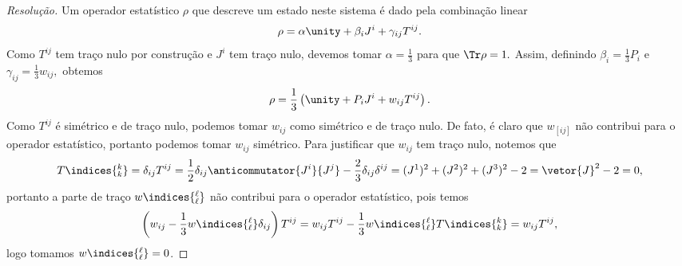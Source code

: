 \begin{proof}[Resolução]
    Um operador estatístico \(\rho\) que descreve um estado neste sistema é dado pela combinação linear
    \begin{equation*}
        \rho = \alpha\unity + \beta_i J^i + \gamma_{ij} T^{ij}.
    \end{equation*}
    Como \(T^{ij}\) tem traço nulo por construção e \(J^i\) tem traço nulo, devemos tomar \(\alpha = \frac13\) para que \(\Tr\rho = 1.\) Assim, definindo \(\beta_i = \frac13 P_i\) e \(\gamma_{ij} = \frac13 w_{ij},\) obtemos
    \begin{equation*}
        \rho = \frac13 \left(\unity + P_i J^i + w_{ij} T^{ij}\right).
    \end{equation*}
    Como \(T^{ij}\) é simétrico e de traço nulo, podemos tomar \(w_{ij}\) como simétrico e de traço nulo. De fato, é claro que \(w_{[ij]}\) não contribui para o operador estatístico, portanto podemos tomar \(w_{ij}\) simétrico. Para justificar que \(w_{ij}\) tem traço nulo, notemos que 
    \begin{equation*}
        T\indices{^k_k} = \delta_{ij} T^{ij} = \frac12 \delta_{ij} \anticommutator{J^i}{J^j} - \frac23 \delta_{ij} \delta^{ij} = (J^1)^2 + (J^2)^2 + (J^3)^2 - 2 = \vetor{J}^2 - 2 = 0,
    \end{equation*}
    portanto a parte de traço \(w\indices{^\ell_\ell}\) não contribui para o operador estatístico, pois temos
    \begin{equation*}
        \left(w_{ij} - \frac13 w\indices{^{\ell}_\ell}\delta_{ij}\right) T^{ij} = w_{ij} T^{ij} - \frac13 w\indices{^{\ell}_\ell} T\indices{^k_k} = w_{ij} T^{ij},
    \end{equation*}
    logo tomamos \(w\indices{^\ell_\ell} = 0\).


\end{proof}
